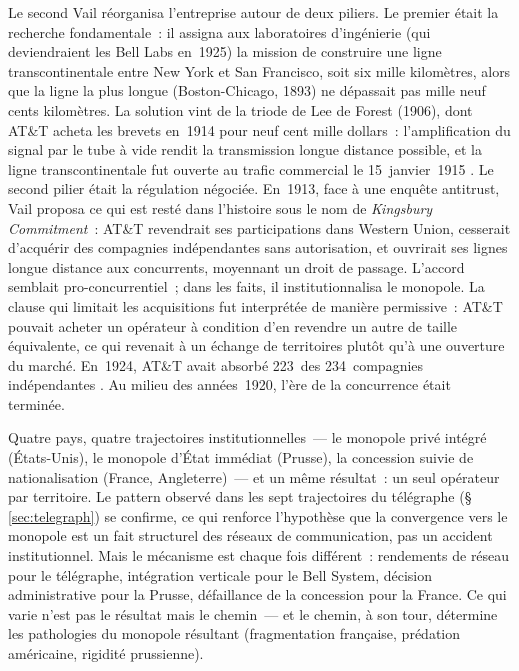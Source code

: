 Le second Vail réorganisa l'entreprise autour de deux piliers. Le premier était la recherche fondamentale~: il assigna aux laboratoires d'ingénierie (qui deviendraient les Bell Labs en~1925) la mission de construire une ligne transcontinentale entre New York et San Francisco, soit six mille kilomètres, alors que la ligne la plus longue (Boston-Chicago, 1893) ne dépassait pas mille neuf cents kilomètres. La solution vint de la triode de Lee de Forest (1906), dont AT\&T acheta les brevets en~1914 pour neuf cent mille dollars~: l'amplification du signal par le tube à vide rendit la transmission longue distance possible, et la ligne transcontinentale fut ouverte au trafic commercial le 15~janvier~1915 \parencite{bertho_histoire_1984}. Le second pilier était la régulation négociée. En~1913, face à une enquête antitrust, Vail proposa ce qui est resté dans l'histoire sous le nom de \emph{Kingsbury Commitment}~: AT\&T revendrait ses participations dans Western Union, cesserait d'acquérir des compagnies indépendantes sans autorisation, et ouvrirait ses lignes longue distance aux concurrents, moyennant un droit de passage. L'accord semblait pro-concurrentiel~; dans les faits, il institutionnalisa le monopole. La clause qui limitait les acquisitions fut interprétée de manière permissive~: AT\&T pouvait acheter un opérateur à condition d'en revendre un autre de taille équivalente, ce qui revenait à un échange de territoires plutôt qu'à une ouverture du marché. En~1924, AT\&T avait absorbé 223~des 234~compagnies indépendantes \parencite{weiman_preying_1994}. Au milieu des années~1920, l'ère de la concurrence était terminée.

%
Quatre pays, quatre trajectoires institutionnelles~--- le monopole privé intégré (États-Unis), le monopole d'État immédiat (Prusse), la concession suivie de nationalisation (France, Angleterre)~--- et un même résultat~: un seul opérateur par territoire. Le pattern observé dans les sept trajectoires du télégraphe (§\,\ref{sec:telegraph}) se confirme, ce qui renforce l'hypothèse que la convergence vers le monopole est un fait structurel des réseaux de communication, pas un accident institutionnel. Mais le mécanisme est chaque fois différent~: rendements de réseau pour le télégraphe, intégration verticale pour le Bell System, décision administrative pour la Prusse, défaillance de la concession pour la France. Ce qui varie n'est pas le résultat mais le chemin~--- et le chemin, à son tour, détermine les pathologies du monopole résultant (fragmentation française, prédation américaine, rigidité prussienne).


